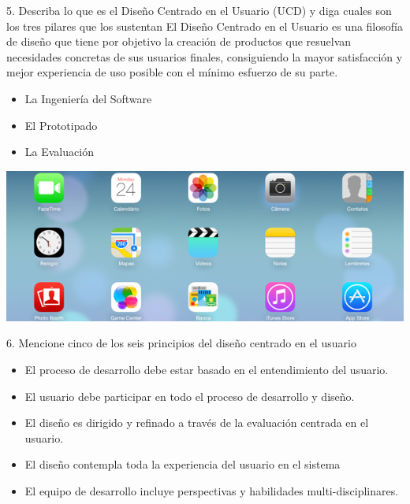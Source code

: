 \documentclass{beamer}
\begin{document}
\begin{frame}
\begin{block}{5. Describa lo que es el Diseño Centrado en el Usuario (UCD) y diga cuales son los tres pilares que los sustentan}
El Diseño Centrado en el Usuario es una filosofía de diseño que tiene por objetivo la creación de productos que resuelvan necesidades concretas de sus usuarios finales, consiguiendo la mayor satisfacción y mejor experiencia de uso posible con el mínimo esfuerzo de su parte.
\begin{itemize}
    \item La Ingeniería del Software
    \item El Prototipado
    \item La Evaluación
\end{itemize}
\end{block}
\end{frame}

\begin{frame}
  \begin{center}
  \includegraphics[scale = 0.5]{4_1.png}
  \end{center}
\end{frame}



\begin{frame}
\begin{block}{6. Mencione cinco de los seis principios del diseño centrado en el usuario}
\begin{itemize}
    \item El proceso de desarrollo debe estar basado en el entendimiento del usuario.
    \item El usuario debe participar en todo el proceso de desarrollo y diseño.
    \item El diseño es dirigido y refinado a través de la evaluación centrada en el usuario.
    \item El diseño contempla toda la experiencia del usuario en el sistema
    \item El equipo de desarrollo incluye perspectivas y habilidades multi-disciplinares.
\end{itemize}
\end{block}
\end{frame}
\end{document}
